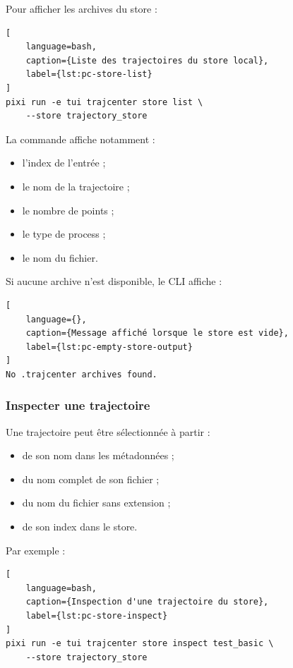 \documentclass{rapportENSAM}
\begin{document}
Pour afficher les archives du store :

\begin{lstlisting}[
    language=bash,
    caption={Liste des trajectoires du store local},
    label={lst:pc-store-list}
]
pixi run -e tui trajcenter store list \
    --store trajectory_store
\end{lstlisting}

La commande affiche notamment :

\begin{itemize}
    \item l'index de l'entrée ;
    \item le nom de la trajectoire ;
    \item le nombre de points ;
    \item le type de process ;
    \item le nom du fichier.
\end{itemize}

Si aucune archive n'est disponible, le CLI affiche :

\begin{lstlisting}[
    language={},
    caption={Message affiché lorsque le store est vide},
    label={lst:pc-empty-store-output}
]
No .trajcenter archives found.
\end{lstlisting}

\subsubsection{Inspecter une trajectoire}
\label{subsubsec:pc-store-inspect}

Une trajectoire peut être sélectionnée à partir :

\begin{itemize}
    \item de son nom dans les métadonnées ;
    \item du nom complet de son fichier ;
    \item du nom du fichier sans extension ;
    \item de son index dans le store.
\end{itemize}

Par exemple :

\begin{lstlisting}[
    language=bash,
    caption={Inspection d'une trajectoire du store},
    label={lst:pc-store-inspect}
]
pixi run -e tui trajcenter store inspect test_basic \
    --store trajectory_store
\end{lstlisting}
\end{document}
